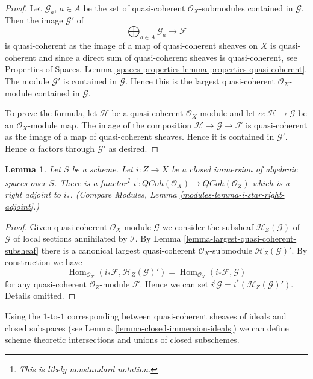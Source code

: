 \documentclass{stacks-project}
\theoremstyle{plain}
\newtheorem{lemma}[subsection]{Lemma}
\theoremstyle{definition}
\theoremstyle{remark}
\numberwithin{equation}{subsection}
\def\Hom{\mathop{\mathrm{Hom}}\nolimits}
\def\QCoh{\mathit{QCoh}}
\begin{document}
\begin{proof}
Let $\mathcal{G}_a$, $a \in A$ be the set of quasi-coherent
$\mathcal{O}_X$-submodules contained in $\mathcal{G}$.
Then the image $\mathcal{G}'$ of
$$
\bigoplus\nolimits_{a \in A} \mathcal{G}_a \longrightarrow \mathcal{F}
$$
is quasi-coherent as the image of a map of quasi-coherent sheaves
on $X$ is quasi-coherent and since a direct sum of quasi-coherent sheaves
is quasi-coherent, see
Properties of Spaces,
Lemma \ref{spaces-properties-lemma-properties-quasi-coherent}.
The module $\mathcal{G}'$ is contained in $\mathcal{G}$. Hence this is the
largest quasi-coherent $\mathcal{O}_X$-module contained in $\mathcal{G}$.

\medskip\noindent
To prove the formula, let $\mathcal{H}$ be a quasi-coherent
$\mathcal{O}_X$-module and let $\alpha : \mathcal{H} \to \mathcal{G}$
be an $\mathcal{O}_X$-module map. The image of the composition
$\mathcal{H} \to \mathcal{G} \to \mathcal{F}$ is quasi-coherent
as the image of a map of quasi-coherent sheaves. Hence it is contained
in $\mathcal{G}'$. Hence $\alpha$ factors through $\mathcal{G}'$
as desired.
\end{proof}

\begin{lemma}
\label{lemma-i-upper-shriek}
Let $S$ be a scheme.
Let $i : Z \to X$ be a closed immersion of algebraic spaces over $S$.
There is a functor\footnote{This is likely nonstandard notation.}
$i^! : \QCoh(\mathcal{O}_X) \to \QCoh(\mathcal{O}_Z)$
which is a right adjoint to $i_*$. (Compare
Modules, Lemma \ref{modules-lemma-i-star-right-adjoint}.)
\end{lemma}

\begin{proof}
Given quasi-coherent $\mathcal{O}_X$-module $\mathcal{G}$ we consider
the subsheaf $\mathcal{H}_Z(\mathcal{G})$ of $\mathcal{G}$ of local sections
annihilated by $\mathcal{I}$. By
Lemma \ref{lemma-largest-quasi-coherent-subsheaf}
there is a canonical largest quasi-coherent $\mathcal{O}_X$-submodule
$\mathcal{H}_Z(\mathcal{G})'$. By construction we have
$$
\Hom_{\mathcal{O}_X}(i_*\mathcal{F}, \mathcal{H}_Z(\mathcal{G})')
=
\Hom_{\mathcal{O}_X}(i_*\mathcal{F}, \mathcal{G})
$$
for any quasi-coherent $\mathcal{O}_Z$-module $\mathcal{F}$.
Hence we can set $i^!\mathcal{G} = i^*(\mathcal{H}_Z(\mathcal{G})')$.
Details omitted.
\end{proof}

\noindent
Using the $1$-to-$1$ corresponding between quasi-coherent sheaves
of ideals and closed subspaces (see
Lemma \ref{lemma-closed-immersion-ideals})
we can define scheme theoretic intersections and unions
of closed subschemes.
\end{document}
